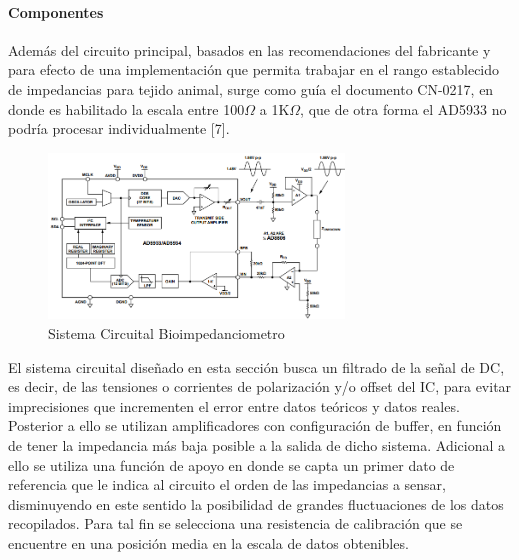 \documentclass[12pt,letterpaper,spanish]{article}
\begin{document}
				\paragraph{Componentes}
				\hfill\break
				Además del circuito principal, basados en las recomendaciones del fabricante y para efecto de una implementación que permita trabajar en el rango establecido de impedancias para tejido animal, surge como guía el documento CN-0217, en donde es habilitado la escala entre 100$\Omega$ a 1K$\Omega$, que de otra forma el AD5933 no podría procesar individualmente [7]. 
				
			\begin{figure}[H]
				\centering
				\includegraphics[width=0.7\textwidth]{./Imagenes/Bio_Circuito.png}
				\caption{Sistema Circuital Bioimpedanciometro}
			\end{figure}				
				
				El sistema circuital diseñado en esta sección busca un filtrado de la señal de DC, es decir, de las tensiones o corrientes de polarización y/o offset del IC, para evitar imprecisiones que incrementen el error entre datos teóricos y datos reales. 
Posterior a ello se utilizan amplificadores con configuración de buffer, en función de tener la impedancia más baja posible a la salida de dicho sistema.
Adicional a ello se utiliza una función de apoyo en donde se capta un primer dato de referencia que le indica al circuito el orden de las impedancias a sensar, disminuyendo en este sentido la posibilidad de grandes fluctuaciones de los datos recopilados. Para tal fin se selecciona una resistencia de calibración que se encuentre en una posición media en la escala de datos obtenibles.
			
\end{document}
